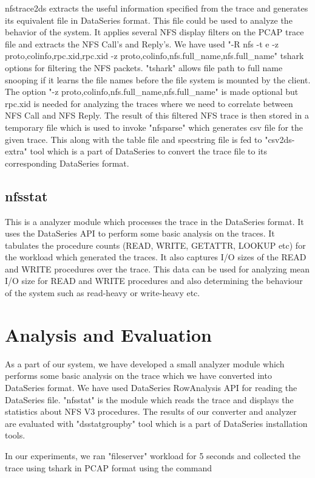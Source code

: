 \documentclass[conference]{IEEEtran}
\begin{document}
\noindent
nfstrace2ds extracts the useful information specified from the trace and generates its equivalent file in DataSeries format. This file could be used to analyze the behavior of the system. It applies several NFS display filters on the PCAP trace file and extracts the NFS Call's and Reply's. We have used "-R nfs -t e -z proto,colinfo,rpc.xid,rpc.xid -z proto,colinfo,nfs.full\_name,nfs.full\_name" tshark options for filtering the NFS packets. "tshark" allows file path to full name snooping if it learns the file names before the file system is mounted by the client. The option "-z proto,colinfo,nfs.full\_name,nfs.full\_name" is made optional but rpc.xid is needed for analyzing the traces where we need to correlate between NFS Call and NFS Reply. The result of this filtered NFS trace is then stored in a temporary file which is used to invoke "nfsparse" which generates csv file for the given trace. This along with the table file and specstring file is fed to "csv2ds-extra" tool which is a part of DataSeries to convert the trace file to its corresponding DataSeries format.

\subsection{nfsstat}
This is a analyzer module which processes the trace in the DataSeries format. It uses the DataSeries API to perform some basic analysis on the traces. It tabulates the procedure counts (READ, WRITE, GETATTR, LOOKUP etc) for the workload which generated the traces. It also captures I/O sizes of the READ and WRITE procedures over the trace. This data can be used for analyzing mean I/O size for READ and WRITE procedures and also determining the behaviour of the system such as read-heavy or write-heavy etc.
\section{Analysis and Evaluation}
As a part of our system, we have developed a small analyzer module which performs some basic analysis on the trace which we have converted into DataSeries format. We have used DataSeries RowAnalysis API for reading the DataSeries file. "nfsstat" is the module which reads the trace and displays the statistics about NFS V3 procedures. The results of our converter and analyzer are evaluated with "dsstatgroupby" tool which is a part of DataSeries installation tools.

\noindent
In our experiments, we ran "fileserver" workload for 5 seconds and collected the trace using tshark in PCAP format using the command \\
\end{document}

